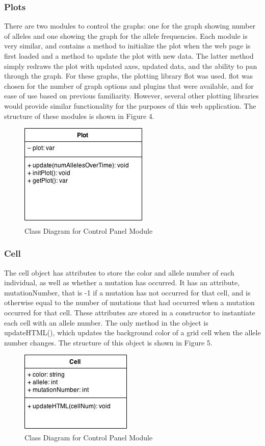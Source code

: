 \documentclass[12pt]{article}
\begin{document}
\begin{spacing}{1.6}
\subsubsection{Plots}
There are two modules to control the graphs: one for the graph showing number of alleles and one showing the graph for the allele frequencies. Each module is very similar, and contains a method to initialize the plot when the web page is first loaded and a method to update the plot with new data. The latter method simply redraws the plot with updated axes, updated data, and the ability to pan through the graph. For these graphs, the plotting library flot \cite{flot} was used. flot was chosen for the number of graph options and plugins that were available, and for ease of use based on previous familiarity. However, several other plotting libraries would provide similar functionality for the purposes of this web application. The structure of these modules is shown in Figure 4.
\begin{figure}[h]
\caption{Class Diagram for Control Panel Module}
\centering
\includegraphics[scale=0.5]{plot-class-diagram}
\end{figure}

\subsubsection{Cell}
The cell object has attributes to store the color and allele number of each individual, as well as whether a mutation has occurred. It has an attribute, mutationNumber, that is -1 if a mutation has not occurred for that cell, and is otherwise equal to the number of mutations that had occurred when a mutation occurred for that cell. These attributes are stored in a constructor to instantiate each cell with an allele number. The only method in the object is updateHTML(), which updates the background color of a grid cell when the allele number changes. The structure of this object is shown in Figure 5.
\begin{figure}[h]
\caption{Class Diagram for Control Panel Module}
\centering
\includegraphics[scale=0.5]{cell-class-diagram}
\end{figure}


\end{spacing}
\end{document}
